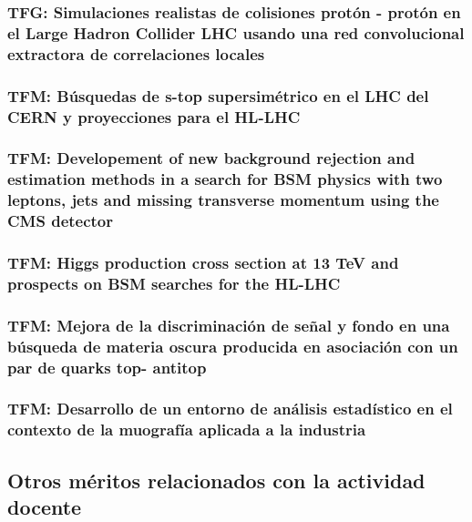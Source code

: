 \documentclass[a4paper, 11pt, twoside, openright]{report}
\begin{document}
\subsubsection{TFG: Simulaciones realistas de colisiones protón - protón en el Large Hadron Collider LHC usando una red convolucional extractora de correlaciones locales}


\subsubsection{TFM: Búsquedas de s-top supersimétrico en el LHC del CERN y proyecciones para el HL-LHC}


\subsubsection{TFM: Developement of new background rejection and estimation methods in a search for BSM physics with two leptons, jets and missing transverse momentum using the CMS detector}


\subsubsection{TFM: Higgs production cross section at 13 TeV and prospects on BSM searches for the HL-LHC}


\subsubsection{TFM: Mejora de la discriminación de señal y fondo en una búsqueda de materia oscura producida en asociación con un par de quarks top- antitop}


\subsubsection{TFM: Desarrollo de un entorno de análisis estadístico en el contexto de la muografía aplicada a la industria}



\subsection{Otros méritos relacionados con la actividad docente}
\end{document}
